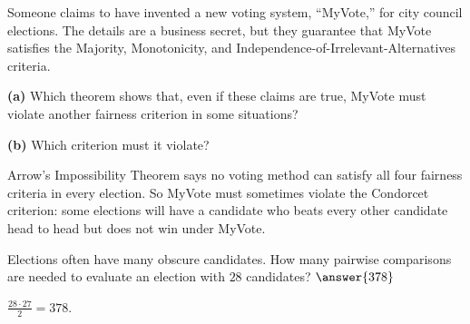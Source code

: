 \documentclass[12pt]{ximera}
\begin{document}
\begin{problem}
Someone claims to have invented a new voting system, ``MyVote,'' for city council
elections. The details are a business secret, but they guarantee that MyVote satisfies
the Majority, Monotonicity, and Independence-of-Irrelevant-Alternatives criteria.

\begin{prompt}
\textbf{(a)} Which theorem shows that, even if these claims are true, MyVote must violate
another fairness criterion in some situations?

\begin{multipleChoice}
\end{multipleChoice}
\end{prompt}

\begin{prompt}
\textbf{(b)} Which criterion must it violate?

\begin{multipleChoice}
\end{multipleChoice}

\begin{feedback}
Arrow's Impossibility Theorem says no voting method can satisfy all four fairness
criteria in every election. So MyVote must sometimes violate the Condorcet criterion:
some elections will have a candidate who beats every other candidate head to head but
does not win under MyVote.
\end{feedback}
\end{prompt}
\end{problem}

\begin{problem}
Elections often have many obscure candidates. How many pairwise comparisons are needed
to evaluate an election with $28$ candidates? $\answer{378}$

\begin{feedback}
$\frac{28\cdot27}{2}=378$.
\end{feedback}
\end{problem}
\end{document}
